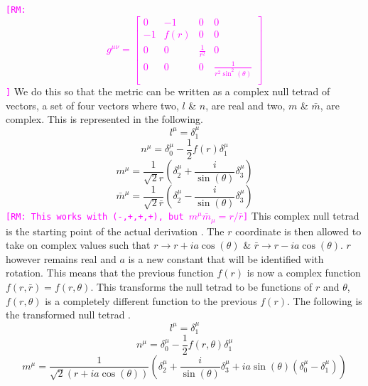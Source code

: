 \documentclass[12pt]{iopart}
\def\rmc#1{\textcolor{magenta}{\tt[RM: #1]}}
\begin{document}
\rmc{\[
   g^{\mu \nu}= 
  \left[ {\begin{array}{ccccc}
0 & -1 & 0 & 0\\
-1 & f(r) & 0 & 0\\
0 & 0 & \frac{1}{r^2} & 0\\
0 & 0 & 0 & \frac{1}{r^2\sin^2(\theta)}\\
  \end{array} } \right]
\]}
 We do this so that the metric can be written as a complex null tetrad of vectors, a set of four vectors where two, $l$ \& $n$, are real and two, $m$ \& $\bar{m}$, are complex. This is represented in the following.
 \begin{equation} 
  l^{\mu}=\delta^{\mu}_1
 \end{equation}
 \begin{equation}
 n^{\mu}=\delta^{\mu}_0-\frac{1}{2}f(r)\delta^{\mu}_1
 \end{equation}
 \begin{equation} 
 m^{\mu}=\frac{1}{\sqrt{2}r}\left(\delta^{\mu}_2+\frac{i}{\sin(\theta)}\delta^{\mu}_3\right)
 \end{equation}
 \begin{equation} 
 \bar{m}^{\mu}=\frac{1}{\sqrt{2}\bar{r}}\left(\delta^{\mu}_2-\frac{i}{\sin(\theta)}\delta^{\mu}_3\right)
 \end{equation}
 \rmc{This works with (-,+,+,+), but $m^\mu \bar{m}_\mu = r/\bar{r}$}
 This complex null tetrad is the starting point of the actual derivation \cite{Drake:1997hh}. The $r$ coordinate is then allowed to take on complex values such that $r \rightarrow r+ia\cos(\theta)$ \& $\bar{r} \rightarrow r-ia\cos(\theta)$. $r$ however remains real and $a$ is a new constant that will be identified with rotation. This means that the previous function $f(r)$ is now a complex function $f(r,\bar{r})=f(r,\theta)$. This transforms the null tetrad to be functions of $r$ and $\theta$, $f(r,\theta)$ is a completely different function to the previous $f(r)$. The following is the transformed null tetrad \cite{Drake:1997hh}.
 \begin{equation} 
 l^{\mu}=\delta^{\mu}_1
 \end{equation}
 \begin{equation}
 n^{\mu}=\delta^{\mu}_0-\frac{1}{2}f(r,\theta)\delta^{\mu}_1
 \end{equation}
 \begin{equation} 
 m^{\mu}=\frac{1}{\sqrt{2}(r+ia\cos(\theta))}\left(\delta^{\mu}_2+\frac{i}{\sin(\theta)}\delta^{\mu}_3+ia\sin(\theta)(\delta^{\mu}_0-\delta^{\mu}_1)\right)
 \end{equation}
\end{document}
